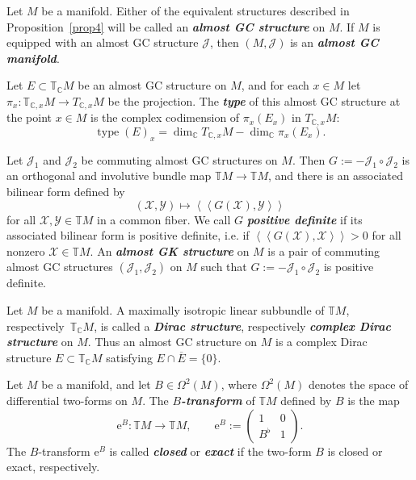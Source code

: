 \documentclass[11pt]{article}
\numberwithin{equation}{section}
\newcommand{\deff}[1]{\textbf{\emph{#1}}}
\newcommand{\func}[3]{#1 \colon #2 \to #3}
\newcommand{\pont}[1]{\mathbb{T} {#1}}
\newcommand{\cpont}[1]{\mathbb{T}_{\mathbb{C}} {#1}}
\newcommand{\tang}{T}
\newcommand{\iiprod}[2]{\left\langle \! \left\langle {#1} , {#2} \right\rangle \! \right\rangle}
\begin{document}
\begin{Definition}
Let $M$ be a manifold.  Either of the equivalent structures described in Proposition~\ref{prop4} will be called an \deff{almost GC structure} on $M$.  If $M$ is equipped with an almost GC structure $\mathcal{J}$, then $(M,\mathcal{J})$ is an \deff{almost GC manifold}.

Let $E \subset \cpont{M}$ be an almost GC structure on $M$, and for each $x \in M$ let $\func{\pi_x}{\mathbb{T}_{\mathbb{C},x} M}{\tang_{\mathbb{C},x} M}$ be the projection.  The \deff{type} of this almost GC structure at the point $x \in M$ is the complex codimension of $\pi_x(E_x)$ in $\tang_{\mathbb{C},x} M$:
\[
  \operatorname{type}(E)_x
  =
  \dim_{\mathbb{C}} \tang_{\mathbb{C},x} M - \dim_{\mathbb{C}} \pi_x(E_x).
\]

Let $\mathcal{J}_1$ and $\mathcal{J}_2$ be commuting almost GC structures on $M$.  Then $G := -\mathcal{J}_1 \circ \mathcal{J}_2$ is an orthogonal and involutive bundle map $\pont{M} \to \pont{M}$, and there is an associated bilinear form def\/ined by
\[
  (\mathcal{X},\mathcal{Y}) \mapsto \iiprod{G(\mathcal{X})}{\mathcal{Y}}
\]
for all $\mathcal{X}, \mathcal{Y} \in \pont{M}$ in a common f\/iber.
We call $G$ \deff{positive definite} if its associated bilinear form is positive def\/inite, i.e. if $\iiprod{G(\mathcal{X})}{\mathcal{X}} > 0$ for all nonzero $\mathcal{X} \in \pont{M}$.
An  \deff{almost GK structure} on $M$ is a pair of commuting almost GC structures $(\mathcal{J}_1,\mathcal{J}_2)$ on $M$ such that $G := -\mathcal{J}_1 \circ \mathcal{J}_2$ is positive def\/inite.
\end{Definition}


\begin{Remark}
Let $M$ be a manifold.  A maximally isotropic linear subbundle of $\pont{M}$, respectively~$\cpont{M}$, is called a \deff{Dirac structure}, respectively \deff{complex Dirac structure} on $M$.
Thus an almost GC structure on $M$ is a complex Dirac structure $E \subset \cpont{M}$ satisfying $E \cap \overline{E} = \{0\}$.
\end{Remark}


\begin{Definition}
Let $M$ be a manifold, and let $B \in \Omega^2(M)$, where $\Omega^2(M)$ denotes the space of dif\/ferential two-forms on $M$.  The \deff{$B$-transform} of $\pont{M}$ def\/ined by $B$ is the map
\[
  \func{\mathrm{e}^{B}}{\pont{M}}{\pont{M}},
  \qquad
  \mathrm{e}^B := \begin{pmatrix} 1 & 0 \\ B^{\flat} & 1 \end{pmatrix}.
\]
The $B$-transform $\mathrm{e}^B$ is called \deff{closed} or \deff{exact} if the two-form $B$ is closed or exact, respectively.
\end{Definition}
\end{document}
